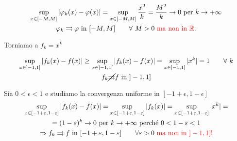 \begin{exbar}
\begin{example}
	\begin{gather*}
		\sup_{x \in [-M,M]} |\phi_k(x) - \phi(x)| = \sup_{x \in [-M,M]} \frac{x^2}{k} = \frac{M^2}{k} \rightarrow 0 \text{ per } k \rightarrow + \infty
		\\
		\phi_k \rightrightarrows \phi \text{ in } [-M, M] \qquad \forall \ M > 0 \
		\text{\textcolor{red}{ ma non in $\mathbb{R}$}.}
	\end{gather*}
	
	Torniamo a $f_k =x^k$
	
	\begin{gather*}
		\sup_{x \in ]-1, 1]} |f_k(x) - f(x)| \geq \sup_{x \in ]-1, 1[} |f_k(x) - f(x)| = \sup_{x \in ]-1, 1[} |x^k| = 1 \qquad \forall \ k
		\\
		f_k \nrightrightarrows f \text{ in } ]-1, 1]
	\end{gather*}
	
	Sia $0 < \epsilon < 1$ e studiamo la convergenza uniforme in $[-1+\epsilon, 1-\epsilon]$
	\begin{gather*}
		\sup_{x \in [-1+\epsilon, 1-\epsilon]} |f_k(x) - f(x)| = \sup_{x \in [-1+\epsilon, 1-\epsilon]} |f_k(x)| = \sup_{x \in [-1+\epsilon, 1-\epsilon]} |x^k| =
		\\
		= (1-\epsilon)^k \rightarrow 0 \text{ per } k \rightarrow +\infty \text{ perché } 0 < 1 - \epsilon < 1 
		\\
		\Rightarrow f_k \rightrightarrows f \text{ in } [-1+\epsilon, 1-\epsilon] \qquad  \forall \epsilon > 0 \ \text{\textcolor{red}{ ma non in $]-1,1]$!}}
	\end{gather*}
\end{example}
\end{exbar}


